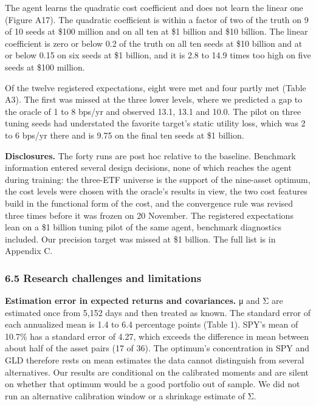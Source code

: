 \documentclass[
  11pt]{article}
\begin{document}
The agent learns the quadratic cost coefficient and does not learn the
linear one (Figure A17). The quadratic coefficient is within a factor of
two of the truth on 9 of 10 seeds at \$100 million and on all ten at \$1
billion and \$10 billion. The linear coefficient is zero or below 0.2 of
the truth on all ten seeds at \$10 billion and at or below 0.15 on six
seeds at \$1 billion, and it is 2.8 to 14.9 times too high on five seeds
at \$100 million.

Of the twelve registered expectations, eight were met and four partly
met (Table A3). The first was missed at the three lower levels, where we
predicted a gap to the oracle of 1 to 8 bps/yr and observed 13.1, 13.1
and 10.0. The pilot on three tuning seeds had understated the favorite
target's static utility loss, which was 2 to 6 bps/yr there and is 9.75
on the final ten seeds at \$1 billion.

\textbf{Disclosures.} The forty runs are post hoc relative to the
baseline. Benchmark information entered several design decisions, none
of which reaches the agent during training: the three-ETF universe is
the support of the nine-asset optimum, the cost levels were chosen with
the oracle's results in view, the two cost features build in the
functional form of the cost, and the convergence rule was revised three
times before it was frozen on 20 November. The registered expectations
lean on a \$1 billion tuning pilot of the same agent, benchmark
diagnostics included. Our precision target was missed at \$1 billion.
The full list is in Appendix C.

\subsubsection{6.5 Research challenges and
limitations}\label{research-challenges-and-limitations}

\textbf{Estimation error in expected returns and covariances.} μ and Σ
are estimated once from 5,152 days and then treated as known. The
standard error of each annualized mean is 1.4 to 6.4 percentage points
(Table 1). SPY's mean of 10.7\% has a standard error of 4.27, which
exceeds the difference in mean between about half of the asset pairs (17
of 36). The optimum's concentration in SPY and GLD therefore rests on
mean estimates the data cannot distinguish from several alternatives.
Our results are conditional on the calibrated moments and are silent on
whether that optimum would be a good portfolio out of sample. We did not
run an alternative calibration window or a shrinkage estimate of Σ.
\end{document}
